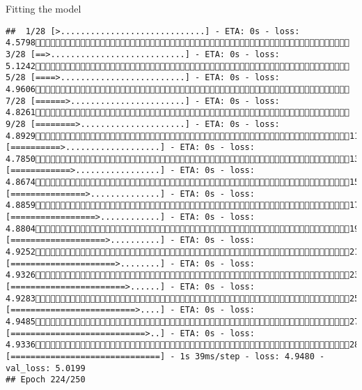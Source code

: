 \documentclass[
  ignorenonframetext,
]{beamer}
\begin{document}
\begin{frame}[fragile]{Fitting the model}
\begin{verbatim}
##  1/28 [>.............................] - ETA: 0s - loss: 4.5798 3/28 [==>...........................] - ETA: 0s - loss: 5.1242 5/28 [====>.........................] - ETA: 0s - loss: 4.9606 7/28 [======>.......................] - ETA: 0s - loss: 4.8261 9/28 [========>.....................] - ETA: 0s - loss: 4.892911/28 [==========>...................] - ETA: 0s - loss: 4.785013/28 [============>.................] - ETA: 0s - loss: 4.867415/28 [===============>..............] - ETA: 0s - loss: 4.885917/28 [=================>............] - ETA: 0s - loss: 4.880419/28 [===================>..........] - ETA: 0s - loss: 4.925221/28 [=====================>........] - ETA: 0s - loss: 4.932623/28 [=======================>......] - ETA: 0s - loss: 4.928325/28 [=========================>....] - ETA: 0s - loss: 4.948527/28 [===========================>..] - ETA: 0s - loss: 4.933628/28 [==============================] - 1s 39ms/step - loss: 4.9480 - val_loss: 5.0199
## Epoch 224/250

\end{verbatim}
\end{frame}
\end{document}
